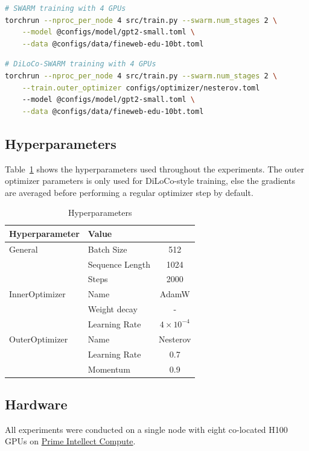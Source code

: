 \documentclass{article}
\begin{document}
\begin{lstlisting}[language=bash]
# SWARM training with 4 GPUs
torchrun --nproc_per_node 4 src/train.py --swarm.num_stages 2 \
    --model @configs/model/gpt2-small.toml \
    --data @configs/data/fineweb-edu-10bt.toml
\end{lstlisting}

\begin{lstlisting}[language=bash]
# DiLoCo-SWARM training with 4 GPUs
torchrun --nproc_per_node 4 src/train.py --swarm.num_stages 2 \
    --train.outer_optimizer configs/optimizer/nesterov.toml
    --model @configs/model/gpt2-small.toml \
    --data @configs/data/fineweb-edu-10bt.toml
\end{lstlisting}

\subsection{Hyperparameters}

Table~\ref{tab:hyperparameters} shows the hyperparameters used throughout the
experiments. The outer optimizer parameters is only used for DiLoCo-style
training, else the gradients are averaged before performing a regular optimizer
step by default.

\begin{table}[ht]
\centering
\begin{tabular}{llc}
\toprule
\textbf{Hyperparameter} & \textbf{Value} \\ 
\midrule
\multirow{1}{*}{General} & Batch Size & 512 \\ 
& Sequence Length & 1024 \\ 
& Steps & 2000 \\
\hline
\multirow{1}{*}{InnerOptimizer} & Name & AdamW \\ 
& Weight decay & - \\ 
& Learning Rate & $4 \times 10^{-4}$ \\ 
\hline
\multirow{1}{*}{OuterOptimizer} & Name & Nesterov \\ 
& Learning Rate & 0.7 \\ 
& Momentum & 0.9 \\ 
\bottomrule
\end{tabular}
\caption{Hyperparameters}
\label{tab:hyperparameters}
\end{table}

\subsection{Hardware}

All experiments were conducted on a single node with eight co-located H100 GPUs
on \href{https://app.primeintellect.com/}{Prime Intellect Compute}.
\end{document}
